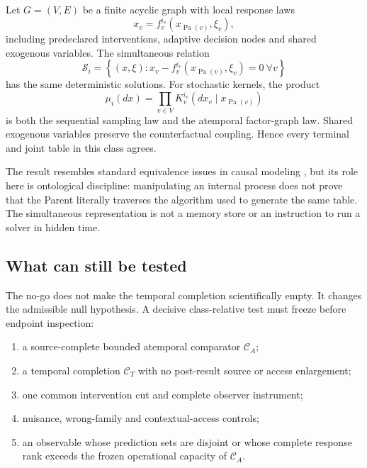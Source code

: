 \documentclass[11pt]{article}
\begin{document}
Let \(G=(V,E)\) be a finite acyclic graph with local response laws
\begin{equation}
 x_v=f_v^{i_v}(x_{\operatorname{Pa}(v)},\xi_v),
 \label{eq:dag-process}
\end{equation}
including predeclared interventions, adaptive decision nodes and shared
exogenous variables.  The simultaneous relation
\begin{equation}
 \mathcal S_i=\left\{(x,\xi):
 x_v-f_v^{i_v}(x_{\operatorname{Pa}(v)},\xi_v)=0
 \ \forall v\right\}
 \label{eq:simultaneous-factor}
\end{equation}
has the same deterministic solutions.  For stochastic kernels, the product
\begin{equation}
 \mu_i(dx)=\prod_{v\in V}
 K_v^{i_v}(dx_v\mid x_{\operatorname{Pa}(v)})
 \label{eq:kernel-factorization}
\end{equation}
is both the sequential sampling law and the atemporal factor-graph law.
Shared exogenous variables preserve the counterfactual coupling.  Hence every
terminal and joint table in this class agrees.

The result resembles standard equivalence issues in causal modeling
\citep{Pearl2009}, but its role here is ontological discipline: manipulating
an internal process does not prove that the Parent literally traverses the
algorithm used to generate the same table.  The simultaneous representation
is not a memory store or an instruction to run a solver in hidden time.

\subsection{What can still be tested}

The no-go does not make the temporal completion scientifically empty.  It
changes the admissible null hypothesis.  A decisive class-relative test must
freeze before endpoint inspection:
\begin{enumerate}[label=(D\arabic*)]
\item a source-complete bounded atemporal comparator \(\mathcal C_A\);
\item a temporal completion \(\mathcal C_T\) with no post-result source or
      access enlargement;
\item one common intervention cut and complete observer instrument;
\item nuisance, wrong-family and contextual-access controls;
\item an observable whose prediction sets are disjoint or whose complete
      response rank exceeds the frozen operational capacity of
      \(\mathcal C_A\).
\end{enumerate}
\end{document}
